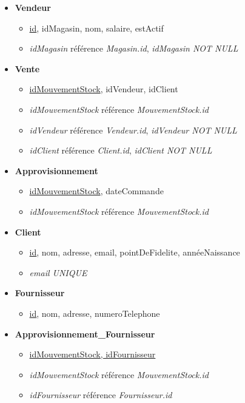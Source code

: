 \documentclass[12pt]{report}
\begin{document}
\begin{itemize}
        \item \textbf{Vendeur}
        \begin{itemize}
            \item \underline{id}, idMagasin, nom, salaire, estActif
            \item \textit{idMagasin} référence \textit{Magasin.id}, \textit{idMagasin NOT NULL}
        \end{itemize}

        \item \textbf{Vente}
        \begin{itemize}
            \item \underline{idMouvementStock}, idVendeur, idClient
            \item \textit{idMouvementStock} référence \textit{MouvementStock.id}
            \item \textit{idVendeur} référence \textit{Vendeur.id}, \textit{idVendeur NOT NULL}
            \item \textit{idClient} référence \textit{Client.id}, \textit{idClient NOT NULL}
        \end{itemize}

        \item \textbf{Approvisionnement}
        \begin{itemize}
            \item \underline{idMouvementStock}, dateCommande
            \item \textit{idMouvementStock} référence \textit{MouvementStock.id}
        \end{itemize}

        \item \textbf{Client}
        \begin{itemize}
            \item \underline{id}, nom, adresse, email, pointDeFidelite, annéeNaissance
            \item \textit{email UNIQUE}
        \end{itemize}

        \item \textbf{Fournisseur}
        \begin{itemize}
            \item \underline{id}, nom, adresse, numeroTelephone
        \end{itemize}

        \item \textbf{Approvisionnement\_Fournisseur}
        \begin{itemize}
            \item \underline{idMouvementStock, idFournisseur}
            \item \textit{idMouvementStock} référence \textit{MouvementStock.id}
            \item \textit{idFournisseur} référence \textit{Fournisseur.id}
        \end{itemize}

    \end{itemize}
\end{document}
